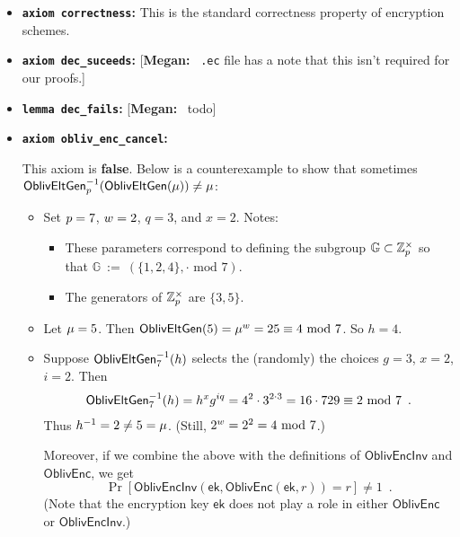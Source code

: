 \documentclass[11pt,letterpaper]{article}
\newcommand{\authnote}[2]{[{\color{red}\textbf{#1:}}~{\color{blue} #2}]}
\newcommand{\authnote}[2]{}
\newcommand{\megan}[1]{\authnote{Megan}{#1}}
\theoremstyle{plain} %
\theoremstyle{definition} %
\theoremstyle{remark} %
\newcommand{\code}[1]{\texttt{#1}} %
\newcommand{\eqdef}{\ {:=} \ }
\newcommand{\OblivEnc}{\mathsf{OblivEnc}}
\newcommand{\OblivEncInv}{\mathsf{OblivEncInv}}
\newcommand{\EncKey}{\mathsf{ek}}
\newcommand{\Rand}{r}
\newcommand{\Integers}{\mathbb{Z}}
\newcommand{\Group}{\mathbb{G}}
\newcommand{\GrpOrd}{q}
\newcommand{\GrpEltH}{h}
\newcommand{\Generator}{g}
\begin{document}
\renewcommand{\mod}{\textrm{ mod }}
\begin{itemize}
\item \textbf{\code{axiom correctness}:} This is the standard correctness property of encryption schemes.
\item \textbf{\code{axiom dec\_suceeds}:} \megan{\code{.ec} file has a note that this isn't required for our proofs.}
\item \textbf{\code{lemma dec\_fails}:} \megan{todo}
\item \textbf{\code{axiom obliv\_enc\_cancel}:}

This axiom is \textbf{\color{red}false}. Below is a counterexample to show that sometimes ${\mathsf{OblivEltGen}}^{-1}_{p}(\mathsf{OblivEltGen}(\mu)) \ne \mu$:
\begin{itemize}[nolistsep]
    \item Set $p = 7$, $w = 2$, $\GrpOrd = 3$, and $x = 2$. Notes:
    \begin{itemize}[nolistsep]
        \item These parameters correspond to defining the subgroup $\Group \subset \MultGrp$ so that $\Group \eqdef (\{1,2,4\}, \cdot \mod 7)$. %
        \item The generators of $\MultGrp$ are $\{3,5\}$.
    \end{itemize}

    \item Let $\mu = 5$. Then $\OblivEltGen(5) = \RandStr^{\OrdW} = 25 \equiv 4 \mod 7$. So $\GrpEltH = 4$.
    \item Suppose $\OblivEltInv_{7}(\GrpEltH)$ selects the (randomly) the choices $\Generator=3$, $x = 2$, $i = 2$. Then
    \begin{align*}
    \OblivEltInv_{7}(\GrpEltH) = \GrpEltH^{x}\Generator^{i\GrpOrd} = 4^2 \cdot 3^{2 \cdot 3} = 16 \cdot 729 \equiv 2 \mod 7
    \enspace.
    \end{align*}
    Thus $\Inv{\GrpEltH} = 2 \ne 5 = \RandStr$. (Still, $2^{\OrdW} = 2^2 = 4 \mod 7$.)

    Moreover, if we combine the above with the definitions of $\OblivEncInv$ and $\OblivEnc$, we get
    \begin{equation*}
    \Pr\left[\OblivEncInv(\EncKey, \OblivEnc(\EncKey, \Rand)) = \Rand\right] \ne 1
    \enspace.
    \end{equation*}
    (Note that the encryption key $\EncKey$ does not play a role in either $\OblivEnc$ or $\OblivEncInv$.)
\end{itemize}


\end{itemize}
\end{document}
